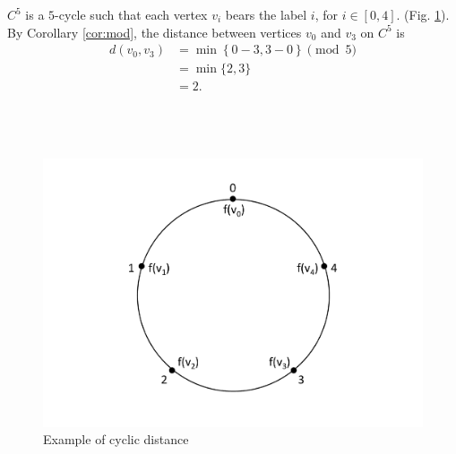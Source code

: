 \begin{example}
$C^5$ is a $5$-cycle such that each vertex $v_i$ bears the label $i$, for $i \in [0, 4]$. (Fig. \ref{cyclic distance}). By Corollary \ref{cor:mod}, the distance between vertices $v_0$ and $v_3$ on $C^5$ is 
\begin{align*}
d(v_0,v_3) &= \min \left\{ 0-3, 3-0\right\} \pmod 5\\
&= \min\{2, 3\}\\
&= 2.
\end{align*}
\\
\\
\\
\begin{figure}
  \centering
      \vspace{-20pt}
    \includegraphics[scale=0.4]{../figures/fig4-1.pdf}
        \vspace{-20pt}
  \caption{Example of cyclic distance}
  \label{cyclic distance}
\end{figure}
\end{example}

